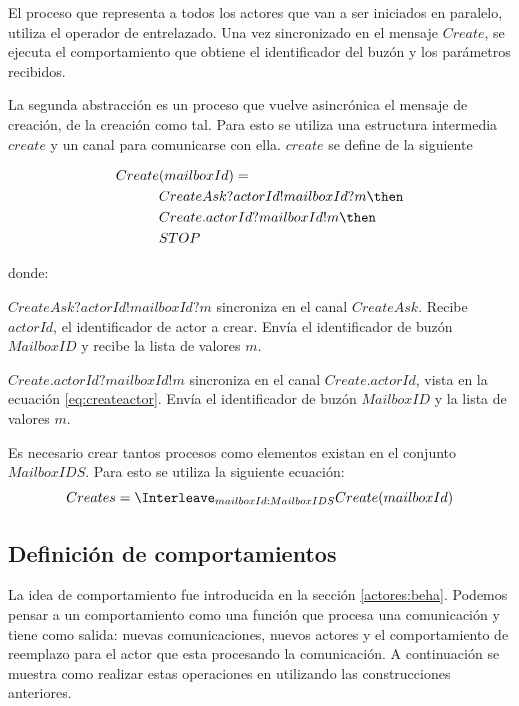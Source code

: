 
El proceso que representa a todos los actores que van a ser iniciados en paralelo, utiliza el operador de entrelazado. Una vez sincronizado en el mensaje $Create$, se ejecuta el comportamiento que obtiene el identificador del buzón y los parámetros recibidos. 

La segunda abstracción es un proceso que vuelve asincrónica el mensaje de creación, de la creación como tal. Para esto se utiliza una estructura intermedia $create$ y un canal para comunicarse con ella. $create$ se define de la siguiente 

\begin{equation}\label{eq:create}
\begin{split}
Create&(mailboxId) = \\
&CreateAsk?actorId!mailboxId?m \then \\
&Create.actorId?mailboxId!m \then \\
&STOP
\end{split}
\end{equation}

donde:
\begin{description}
 \item $CreateAsk?actorId!mailboxId?m$ sincroniza en el canal $CreateAsk$. Recibe $actorId$, el identificador de actor a crear. Envía el identificador de buzón $MailboxID$ y recibe la lista de valores $m$.
 \item $Create.actorId?mailboxId!m$ sincroniza en el canal $Create.actorId$, vista en la ecuación \ref{eq:createactor}. Envía el identificador de buzón $MailboxID$ y la lista de valores $m$.

\end{description}
Es necesario crear tantos procesos como elementos existan en el conjunto $MailboxIDS$. Para esto se utiliza la siguiente ecuación:
\begin{equation}\label{eq:creates}
Creates = \Interleave_{mailboxId : MailboxIDS} Create(mailboxId)
\end{equation}

\subsection{Definición de comportamientos}
La idea de comportamiento fue introducida en la sección \ref{actores:beha}. Podemos pensar a un comportamiento como una función que procesa una comunicación y tiene como salida: nuevas comunicaciones, nuevos actores y el comportamiento de reemplazo para el actor que esta procesando la comunicación. A continuación se muestra como realizar estas operaciones en \CSP utilizando las construcciones anteriores.

